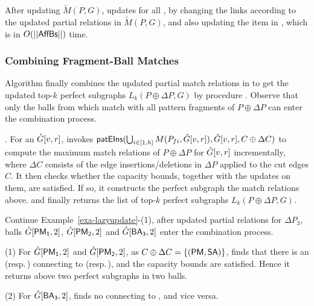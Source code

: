 \vspace{0.5ex}
 After updating $\tilde{M}(P,G)$,
\incp updates \fb for all \affballsx, by changing the links according to the updated partial relations in $\tilde{M}(P,G)$, and also updating the  item in \bs, which is in $O(||{\mathsf{AffBs}}||)$ time.


\subsubsection{Combining Fragment-Ball Matches}
\label{subsubsec-combine}

Algorithm \incp finally combines the updated partial match relations in \affballsx to get the updated top-$k$ perfect subgraphs $L_{k}(P\oplus \Delta P,G)$ by procedure \comb. Observe that only the balls from \affballsx which match with all pattern fragments of $P\oplus \Delta P$ can enter the combination process.



. For an \affballx $\hat{G}{[v,r]}$, \comb invokes ${\mathsf{patEIns}}(\bigcup_{i\in [1, h]}M(P_{fi},\hat{G}{[v,r]}), \hat{G}{[v,r]}, C\oplus \Delta C)$
to compute the maximum match relations of $P\oplus \Delta P$ for $\hat{G}{[v,r]}$ incrementally,
where $\Delta C$ consists of the edge insertions/deletions in $\Delta P$ applied to the cut edges $C$.
It then checks whether the capacity bounds, together with the updates on them, are satisfied.
If so, it constructs the perfect subgraph \wrt the match relations above.
 and finally returns the list of top-$k$ perfect subgraphs $L_{k}(P\oplus \Delta P,G)$.



\begin{example}
\label{exa-combination}
Continue Example~\ref{exa-lazyupdate}-(1), after \incp updated partial relations for \affballsx \wrt $\Delta P_3$,
balls $\hat{G}{[{\mathsf{PM_1}},2]}$, $\hat{G}{[{\mathsf{PM_2}},2]}$ and $\hat{G}{[{\mathsf{BA_3}},2]}$ enter the combination process.

\sstab
(1) For $\hat{G}{[{\mathsf{PM_1}},2]}$ and $\hat{G}{[{\mathsf{PM_2}},2]}$, as $C\oplus \Delta C=\{({\mathsf{PM}},{\mathsf{SA}})\}$,
\comb finds that there is an  (resp.\,) connecting to  (resp.\,),
and the capacity bounds are satisfied. 
Hence it returns above two perfect subgraphs in two balls.

\sstab
(2) For $\hat{G}{[{\mathsf{BA_3}},2]}$, \comb finds no  connecting to , and vice versa.
\end{example}



